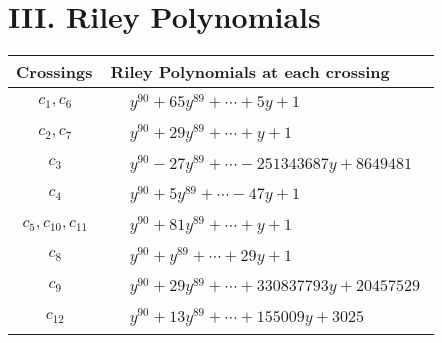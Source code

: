 \documentclass[1p]{elsarticle_modified}
\theoremstyle{definition}
\begin{document}
\centering \section*{ III. Riley Polynomials}
\begin{tabular}{m{50pt}|m{274pt}}
Crossings & \hspace{64pt}Riley Polynomials at each crossing \\
\hline $$\begin{aligned}c_{1},c_{6}\end{aligned}$$&$\begin{aligned}
&y^{90}+65 y^{89}+\cdots+5 y+1
\end{aligned}$\\
\hline $$\begin{aligned}c_{2},c_{7}\end{aligned}$$&$\begin{aligned}
&y^{90}+29 y^{89}+\cdots+y+1
\end{aligned}$\\
\hline $$\begin{aligned}c_{3}\end{aligned}$$&$\begin{aligned}
&y^{90}-27 y^{89}+\cdots-251343687 y+8649481
\end{aligned}$\\
\hline $$\begin{aligned}c_{4}\end{aligned}$$&$\begin{aligned}
&y^{90}+5 y^{89}+\cdots-47 y+1
\end{aligned}$\\
\hline $$\begin{aligned}c_{5},c_{10},c_{11}\end{aligned}$$&$\begin{aligned}
&y^{90}+81 y^{89}+\cdots+y+1
\end{aligned}$\\
\hline $$\begin{aligned}c_{8}\end{aligned}$$&$\begin{aligned}
&y^{90}+y^{89}+\cdots+29 y+1
\end{aligned}$\\
\hline $$\begin{aligned}c_{9}\end{aligned}$$&$\begin{aligned}
&y^{90}+29 y^{89}+\cdots+330837793 y+20457529
\end{aligned}$\\
\hline $$\begin{aligned}c_{12}\end{aligned}$$&$\begin{aligned}
&y^{90}+13 y^{89}+\cdots+155009 y+3025
\end{aligned}$\\
\hline
\end{tabular}
\vskip 2pc
\end{document}
